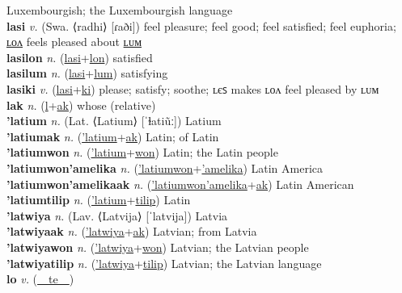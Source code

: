 Luxembourgish; the Luxembourgish language \label{'lasapuactilip} \\
\textbf{lasi} \textit{v.} (Swa. ⟨radhi⟩ [ɾaði])
feel pleasure; feel good; feel satisfied; feel euphoria; \hyperref[lasilon]{ʟᴏᴧ} feels pleased about \hyperref[lasilum]{ʟᴜᴍ} \label{lasi} \\
\textbf{lasilon} \textit{n.} (\hyperref[lasi]{lasi}+\hyperref[lon]{lon})
satisfied \label{lasilon} \\
\textbf{lasilum} \textit{n.} (\hyperref[lasi]{lasi}+\hyperref[lum]{lum})
satisfying \label{lasilum} \\
\textbf{lasiki} \textit{v.} (\hyperref[lasi]{lasi}+\hyperref[ki]{ki})
please; satisfy; soothe; ʟєꜱ makes ʟᴏᴧ feel pleased by ʟᴜᴍ \label{lasiki} \\
\textbf{lak} \textit{n.} (\hyperref[l]{l}+\hyperref[k]{ak})
whose (relative) \label{lak} \\
\textbf{'latium} \textit{n.} (Lat. ⟨Latium⟩ [ˈɫatiũː])
Latium \label{'latium} \\
\textbf{'latiumak} \textit{n.} (\hyperref['latium]{'latium}+\hyperref[ak]{ak})
Latin; of Latin \label{'latiumak} \\
\textbf{'latiumwon} \textit{n.} (\hyperref['latium]{'latium}+\hyperref[won]{won})
Latin; the Latin people \label{'latiumwon} \\
\textbf{'latiumwon'amelika} \textit{n.} (\hyperref['latiumwon]{'latiumwon}+\hyperref['amelika]{'amelika})
Latin America \label{'latiumwon'amelika} \\
\textbf{'latiumwon'amelikaak} \textit{n.} (\hyperref['latiumwon'amelika]{'latiumwon'amelika}+\hyperref[ak]{ak})
Latin American \label{'latiumwon'amelikaak} \\
\textbf{'latiumtilip} \textit{n.} (\hyperref['latium]{'latium}+\hyperref[tilip]{tilip})
Latin \label{'latiumtilip} \\
\textbf{'latwiya} \textit{n.} (Lav. ⟨Latvija⟩ [ˈlatvija])
Latvia \label{'latwiya} \\
\textbf{'latwiyaak} \textit{n.} (\hyperref['latwiya]{'latwiya}+\hyperref[ak]{ak})
Latvian; from Latvia \label{'latwiyaak} \\
\textbf{'latwiyawon} \textit{n.} (\hyperref['latwiya]{'latwiya}+\hyperref[won]{won})
Latvian; the Latvian people \label{'latwiyawon} \\
\textbf{'latwiyatilip} \textit{n.} (\hyperref['latwiya]{'latwiya}+\hyperref[tilip]{tilip})
Latvian; the Latvian language \label{'latwiyatilip} \\
\textbf{lo} \textit{v.} (\hyperref[te]{~~te~~})
